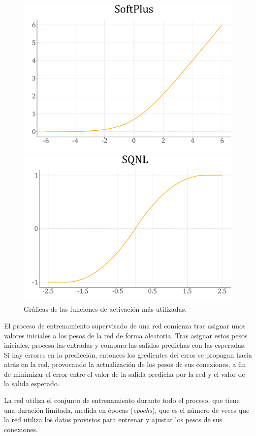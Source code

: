 \documentclass[spanish,a4paper,12pt,twoside]{report}
\begin{document}
    \begin{figure}[H]
      \begin{minipage}{0.49\textwidth}
        \centering
        \includegraphics[width = 1\linewidth]{resources/Fig12_7.pdf}
      \end{minipage}
      \begin{minipage}{0.49\textwidth}
        \centering
        \includegraphics[width = 1\linewidth]{resources/Fig12_8.pdf}
      \end{minipage}
      \caption{Gráficas de las funciones de activación más utilizadas.}
      \label{fig:12}
    \end{figure} \par
    El proceso de entrenamiento supervisado de una red comienza tras asignar unos valores iniciales a los pesos de la red de forma aleatoria. Tras asignar estos pesos iniciales, procesa las entradas y compara las salidas predichas con las esperadas. Si hay errores en la predicción, entonces los gredientes del error se propagan hacia atrás en la red, provocando la actualización de los pesos de sus conexiones, a fin de minimizar el error entre el valor de la salida predicha por la red y el valor de la salida esperado. \par
    La red utiliza el conjunto de entrenamiento durante todo el proceso, que tiene una duración limitada, medida en épocas (\emph{epochs}), que es el número de veces que la red utiliza los datos provistos para entrenar y ajustar los pesos de sus conexiones.
    
\end{document}
